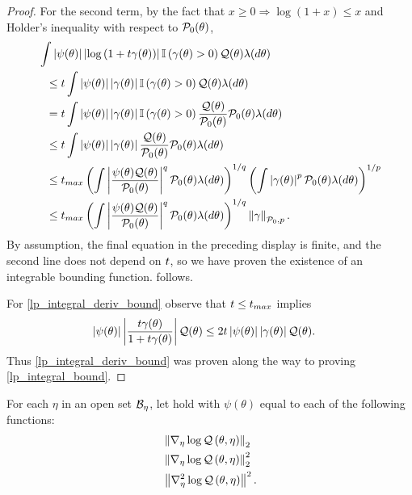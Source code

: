 \begin{lem}
\begin{proof}
For the second term, by the fact that $x \ge 0 \Rightarrow \log (1 + x) \le x$
and Holder's inequality with respect to $\mathcal{P}_{0}(\theta)$,
%
\begin{align*}
%
\MoveEqLeft
\int \abs{\psi(\theta)}
    \abs{\log\left(1 + \t \gamma(\theta)\right)}
    \ind{\gamma(\theta) > 0}
    \q(\theta)\lambda(d\theta)
\\\le{}&
\t
\int \abs{\psi(\theta)}
    \abs{\gamma(\theta)}
    \ind{\gamma(\theta) > 0}
    \q(\theta)\lambda(d\theta)
\\={}&
\t
\int \abs{\psi(\theta)}
    \abs{\gamma(\theta)}
    \ind{\gamma(\theta) > 0}
    \frac{\q(\theta)}{\pbase(\theta)} \pbase(\theta) \lambda(d\theta)
\\\le{}&
\t
\int \abs{\psi(\theta)}
    \abs{\gamma(\theta)}
    \frac{\q(\theta)}{\pbase(\theta)} \pbase(\theta) \lambda(d\theta)
\\\le{}&
\t_{max}
\left(
\int
    \abs{\frac{\psi(\theta)\q(\theta)}{\pbase(\theta)}}^q
    \pbase(\theta) \lambda(d\theta)
\right)^{1/q}
\left(
\int\abs{\gamma(\theta)}^p \pbase(\theta) \lambda(d\theta)
\right)^{1/p}
\\\le{}&
\t_{max}
\left(
\int
    \abs{\frac{\psi(\theta)\q(\theta)}{\pbase(\theta)}}^q
    \pbase(\theta) \lambda(d\theta)
\right)^{1/q}
\norm{\gamma}_{\pbase,p}.
%
\end{align*}
%
By assumption, the final equation in the preceding display is finite, and the
second line does not depend on $t$, so we have proven the existence of an
integrable bounding function.   follows.

For \eqref{lp_integral_deriv_bound} observe that $t \le t_{max}$ implies
%
\begin{align*}
%
\abs{\psi(\theta)}
    \abs{\frac{\t \gamma(\theta)}{1 + \t \gamma(\theta)}} \q(\theta)
\le{}&
2 \t \abs{\psi(\theta)} \abs{\gamma(\theta)} \q(\theta).
%
\end{align*}
%
Thus \eqref{lp_integral_deriv_bound} was proven along the way to
proving \eqref{lp_integral_bound}.
%
\end{proof}
%
\end{lem}


\begin{assu}
%
For each $\eta$ in an open set $\mathcal{B}_\eta$, let  hold with
$\psi(\theta)$ equal to each of the following functions:
%
\begin{align*}
%
& \norm{\lqgrad{\theta, \eta}}_2 \\
& \norm{\lqgrad{\theta, \eta}}^2_2 \\
& \norm{\lqhess{\theta, \eta}}^2.
%
\end{align*}
%
\end{assu}

